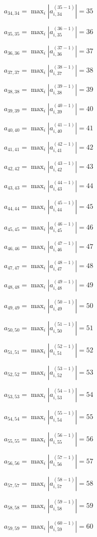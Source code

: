 \documentclass[a4paper,12pt]{article}
\begin{document}
$a _{ 34, 34 } =  \max _i |a _{ i, 34 } ^{ (35 - 1) } | = 35$

$a _{ 35, 35 } =  \max _i |a _{ i, 35 } ^{ (36 - 1) } | = 36$

$a _{ 36, 36 } =  \max _i |a _{ i, 36 } ^{ (37 - 1) } | = 37$

$a _{ 37, 37 } =  \max _i |a _{ i, 37 } ^{ (38 - 1) } | = 38$

$a _{ 38, 38 } =  \max _i |a _{ i, 38 } ^{ (39 - 1) } | = 39$

$a _{ 39, 39 } =  \max _i |a _{ i, 39 } ^{ (40 - 1) } | = 40$

$a _{ 40, 40 } =  \max _i |a _{ i, 40 } ^{ (41 - 1) } | = 41$

$a _{ 41, 41 } =  \max _i |a _{ i, 41 } ^{ (42 - 1) } | = 42$

$a _{ 42, 42 } =  \max _i |a _{ i, 42 } ^{ (43 - 1) } | = 43$

$a _{ 43, 43 } =  \max _i |a _{ i, 43 } ^{ (44 - 1) } | = 44$

$a _{ 44, 44 } =  \max _i |a _{ i, 44 } ^{ (45 - 1) } | = 45$

$a _{ 45, 45 } =  \max _i |a _{ i, 45 } ^{ (46 - 1) } | = 46$

$a _{ 46, 46 } =  \max _i |a _{ i, 46 } ^{ (47 - 1) } | = 47$

$a _{ 47, 47 } =  \max _i |a _{ i, 47 } ^{ (48 - 1) } | = 48$

$a _{ 48, 48 } =  \max _i |a _{ i, 48 } ^{ (49 - 1) } | = 49$

$a _{ 49, 49 } =  \max _i |a _{ i, 49 } ^{ (50 - 1) } | = 50$

$a _{ 50, 50 } =  \max _i |a _{ i, 50 } ^{ (51 - 1) } | = 51$

$a _{ 51, 51 } =  \max _i |a _{ i, 51 } ^{ (52 - 1) } | = 52$

$a _{ 52, 52 } =  \max _i |a _{ i, 52 } ^{ (53 - 1) } | = 53$

$a _{ 53, 53 } =  \max _i |a _{ i, 53 } ^{ (54 - 1) } | = 54$

$a _{ 54, 54 } =  \max _i |a _{ i, 54 } ^{ (55 - 1) } | = 55$

$a _{ 55, 55 } =  \max _i |a _{ i, 55 } ^{ (56 - 1) } | = 56$

$a _{ 56, 56 } =  \max _i |a _{ i, 56 } ^{ (57 - 1) } | = 57$

$a _{ 57, 57 } =  \max _i |a _{ i, 57 } ^{ (58 - 1) } | = 58$

$a _{ 58, 58 } =  \max _i |a _{ i, 58 } ^{ (59 - 1) } | = 59$

$a _{ 59, 59 } =  \max _i |a _{ i, 59 } ^{ (60 - 1) } | = 60$
\end{document}
